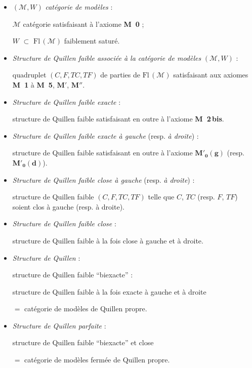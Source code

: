 \documentclass[11pt]{article}
\newcommand{\printedpage}[1]{\marginpar{\footnotesize p.~#1}}
\newcommand{\Fl}{\mathrm{Fl}\,}
\newcommand{\Mo}{\mathcal{M}}
\newcommand{\Mzg}{$\mathbf{M}'_{\mathbf{0}}\mathbf{(g)}$}
\newcommand{\Mzd}{$\mathbf{M}'_{\mathbf{0}}\mathbf{(d)}$}
\begin{document}
\begin{itemize}
\item[\textbullet] $(\Mo,W)$ \textit{catégorie de modèles} :

$\Mo$ catégorie satisfaisant à l'axiome \textbf{M~0} ;

$W$ $\subset$ $\Fl(\Mo)$ faiblement saturé.

\item[\textbullet] \textit{Structure de Quillen faible associée à la catégorie de modèles} $(\Mo,W)$ :

quadruplet $(C,F,TC,TF)$ de parties de $\Fl(\Mo)$ satisfaisant aux axiomes \textbf{M~1} à \textbf{M~5}, $\mathbf{M}'$, $\mathbf{M}''$.

\item[\textbullet] \textit{Structure de Quillen faible exacte} :

structure de Quillen faible satisfaisant en outre à l'axiome \textbf{M~2\,bis}.

\item[\textbullet] \textit{Structure de Quillen faible exacte à gauche} (resp. \textit{à droite}) :

structure de Quillen faible satisfaisant en outre à l'axiome \Mzg{} (resp. \Mzd).
\end{itemize}

\printedpage{61}

\begin{itemize}
\item[\textbullet] \textit{Structure de Quillen faible close à gauche} (resp. \textit{à droite}) :

structure de Quillen faible $(C,F,TC,TF)$ telle que $C$, $TC$ (resp. $F$, $TF$) soient clos à gauche (resp. à droite).

\item[\textbullet] \textit{Structure de Quillen faible close} :

structure de Quillen faible à la fois close à gauche et à droite.

\item[\textbullet] \textit{Structure de Quillen} :

structure de Quillen faible “biexacte” :

structure de Quillen faible à la fois exacte à gauche et à droite

$=$ catégorie de modèles de Quillen propre.

\item[\textbullet] \textit{Structure de Quillen parfaite} :

structure de Quillen faible “biexacte” et close

$=$ catégorie de modèles fermée de Quillen propre.
\end{itemize}
\end{document}
